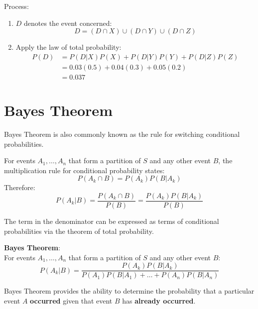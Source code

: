 \documentclass[10pt,a4paper]{article}
\begin{document}
Process:
\begin{enumerate}
    \item $D$ denotes the event concerned:
    $$
        D = (D \cap X) \cup (D\cap Y) \cup (D\cap Z)
    $$

    \item Apply the law of total probability:
    \begin{align*}
        P(D) &= P(D|X)P(X)+P(D|Y)P(Y)+P(D|Z)P(Z) \\
        &= 0.03(0.5) + 0.04(0.3) + 0.05(0.2) \\
        &= 0.037
    \end{align*}
\end{enumerate}

\section{Bayes Theorem}

Bayes Theorem is also commonly known as the rule for switching conditional probabilities.

For events $A_1,\dots,A_n$ that form a partition of $S$ and any other event $B$, the multiplication rule
for conditional probability states:
$$
    P(A_k \cap B) = P(A_k)P(B|A_k)
$$
Therefore:
$$
    P(A_k|B) = \frac{P(A_k\cap B)}{P(B)} = \frac{P(A_k)P(B|A_k)}{P(B)}
$$

The term in the denominator can be expressed as terms of conditional probabilities via the theorem
of total probability.

\begin{tcolorbox}[breakable,colback=white]
\textbf{Bayes Theorem}:
\\
For events $A_1,\dots,A_n$ that form a partition of $S$ and any other event $B$:
$$
    P(A_k|B) = \frac{P(A_k)P(B|A_k)}{P(A_1)P(B|A_1)+\dots+P(A_n)P(B|A_n)}
$$
\end{tcolorbox}

Bayes Theorem provides the ability to determine the probability that a particular event $A$
\textbf{occurred} given that event $B$ has \textbf{already occurred}.
\end{document}
